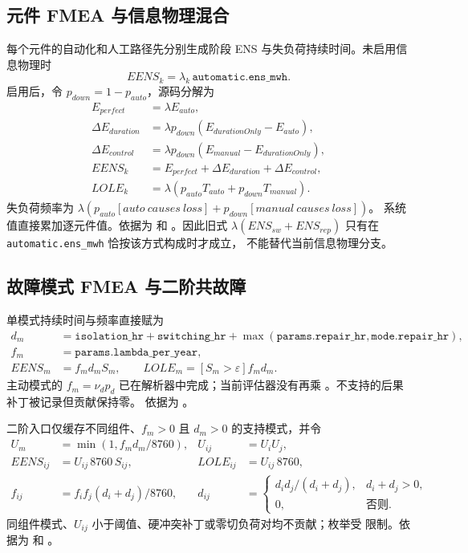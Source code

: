 \subsection{元件 FMEA 与信息物理混合}

每个元件的自动化和人工路径先分别生成阶段 ENS 与失负荷持续时间。未启用信息物理时
\begin{equation}
 EENS_k=\lambda_k\,\texttt{automatic.ens\_mwh}.
\end{equation}
启用后，令 $p_{down}=1-p_{auto}$，源码分解为
\begin{align}
 E_{perfect}&=\lambda E_{auto},\\
 \Delta E_{duration}&=\lambda p_{down}(E_{durationOnly}-E_{auto}),\\
 \Delta E_{control}&=\lambda p_{down}(E_{manual}-E_{durationOnly}),\\
 EENS_k&=E_{perfect}+\Delta E_{duration}+\Delta E_{control},\\
 LOLE_k&=\lambda\left(p_{auto}T_{auto}+p_{down}T_{manual}\right).
\end{align}
失负荷频率为
$\lambda(p_{auto}[auto\ causes\ loss]+p_{down}[manual\ causes\ loss])$。
系统值直接累加逐元件值。依据为
 和
。因此旧式
$\lambda(ENS_{sw}+ENS_{rep})$ 只有在 \texttt{automatic.ens\_mwh} 恰按该方式构成时才成立，
不能替代当前信息物理分支。

\subsection{故障模式 FMEA 与二阶共故障}

单模式持续时间与频率直接赋为
\begin{align}
 d_m&=\texttt{isolation\_hr}+\texttt{switching\_hr}
 +\max(\texttt{params.repair\_hr},\texttt{mode.repair\_hr}),\\
 f_m&=\texttt{params.lambda\_per\_year},\\
 EENS_m&=f_md_mS_m,\qquad LOLE_m=[S_m>\varepsilon]f_md_m.
\end{align}
主动模式的 $f_m=\nu_dp_d$ 已在解析器中完成；当前评估器没有再乘
。不支持的后果补丁被记录但贡献保持零。
依据为 。

二阶入口仅缓存不同组件、$f_m>0$ 且 $d_m>0$ 的支持模式，并令
\begin{align}
 U_m&=\min(1,f_md_m/8760),& U_{ij}&=U_iU_j,\\
 EENS_{ij}&=U_{ij}\,8760\,S_{ij},& LOLE_{ij}&=U_{ij}\,8760,\\
 f_{ij}&=f_if_j(d_i+d_j)/8760,&
 d_{ij}&=\begin{cases}d_id_j/(d_i+d_j),&d_i+d_j>0,\\0,&\text{否则}.
 \end{cases}
\end{align}
同组件模式、$U_{ij}$ 小于阈值、硬冲突补丁或零切负荷对均不贡献；枚举受
 限制。依据为  和
。

